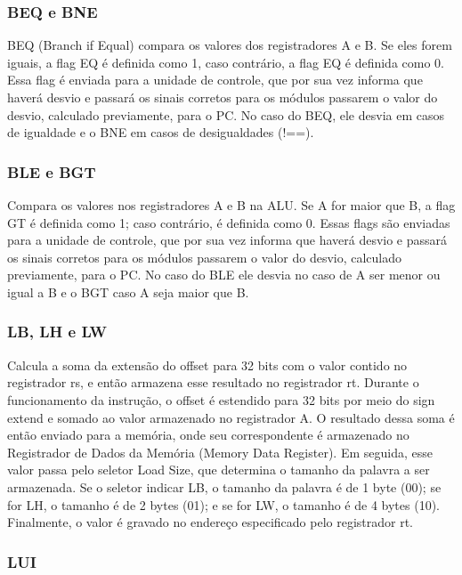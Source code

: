 \subsubsection{BEQ e BNE}

BEQ (Branch if Equal) compara os valores dos registradores A e B. Se eles forem iguais, a flag EQ é definida como 1, caso contrário, a flag EQ é definida como 0. Essa flag é enviada para a unidade de controle, que por sua vez informa que haverá desvio e passará os sinais corretos para os módulos passarem o valor do desvio, calculado previamente, para o PC. No caso do BEQ, ele desvia em casos de igualdade e o BNE em casos de desigualdades (!==).

\subsubsection{BLE e BGT}

Compara os valores nos registradores A e B na ALU. Se A for maior que B, a flag GT é definida como 1; caso contrário, é definida como 0. Essas flags são enviadas para a unidade de controle, que por sua vez informa que haverá desvio e passará os sinais corretos para os módulos passarem o valor do desvio, calculado previamente, para o PC. No caso do BLE ele desvia no caso de A ser menor ou igual a B e o BGT caso A seja maior que B.


\subsubsection{LB, LH e LW}

Calcula a soma da extensão do offset para 32 bits com o valor contido no registrador rs, e então armazena esse resultado no registrador rt. Durante o funcionamento da instrução, o offset é estendido para 32 bits por meio do sign extend e somado ao valor armazenado no registrador A. O resultado dessa soma é então enviado para a memória, onde seu correspondente é armazenado no Registrador de Dados da Memória (Memory Data Register). Em seguida, esse valor passa pelo seletor Load Size, que determina o tamanho da palavra a ser armazenada. Se o seletor indicar LB, o tamanho da palavra é de 1 byte (00); se for LH, o tamanho é de 2 bytes (01); e se for LW, o tamanho é de 4 bytes (10). Finalmente, o valor é gravado no endereço especificado pelo registrador rt.

\subsubsection{LUI}

